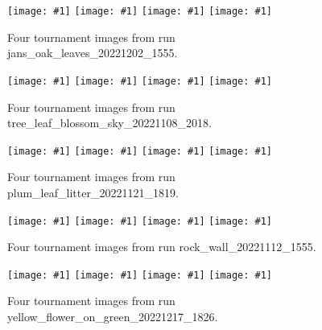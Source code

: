 \documentclass[acmtog]{acmart}
\newcommand{\igfour}[1]{\texttt{[image: \#1]}}
\begin{document}







\begin{figure}
    \igfour{20221202_1555_step_6460.png}
    \hfill
    \igfour{20221202_1555_step_6560.png}
    \hfill
    \igfour{20221202_1555_step_6830.png}
    \hfill
    \igfour{20221202_1555_step_7124.png}
    \caption{Four tournament images from run jans\_oak\_leaves\_20221202\_1555.}
    \label{fig:jans_oak_leaves_4x}
\end{figure}

\begin{figure}
    \igfour{20221108_2018_step_4655.png}
    \hfill
    \igfour{20221108_2018_step_5498.png}
    \hfill
    \igfour{20221108_2018_step_5947.png}
    \hfill
    \igfour{20221108_2018_step_6562.png}
    \caption{Four tournament images from run tree\_leaf\_blossom\_sky\_20221108\_2018.}
    \label{fig:tree_leaf_blossom_sky_4x}
\end{figure}


\begin{figure}
    \igfour{20221121_1819_step_6324.png}
    \hfill
    \igfour{20221121_1819_step_6464.png}
    \hfill
    \igfour{20221121_1819_step_6677.png}
    \hfill
    \igfour{20221121_1819_step_6755.png}
    \caption{Four tournament images from run plum\_leaf\_litter\_20221121\_1819.}
    \label{fig:plum_leaf_litter_4x}
\end{figure}

\begin{figure}
    \igfour{20221112_1555_step_6495.png}
    \hfill
    \igfour{20221112_1555_step_5510.png}
    \hfill
    \igfour{20221112_1555_step_5681.png}
    \hfill
    \igfour{20221112_1555_step_6370.png}
    \caption{Four tournament images from run rock\_wall\_20221112\_1555.}
    \label{fig:rock_wall_4x}
\end{figure}

\begin{figure}
    \igfour{20221218_step_5396.png}
    \hfill
    \igfour{20221218_step_5641.png}
    \hfill
    \igfour{20221218_step_5947.png}
    \hfill
    \igfour{20221218_step_6753.png}
    \caption{Four tournament images from run yellow\_flower\_on\_green\_20221217\_1826.}
    \label{fig:yellow_flower_4x}
\end{figure}
\end{document}
